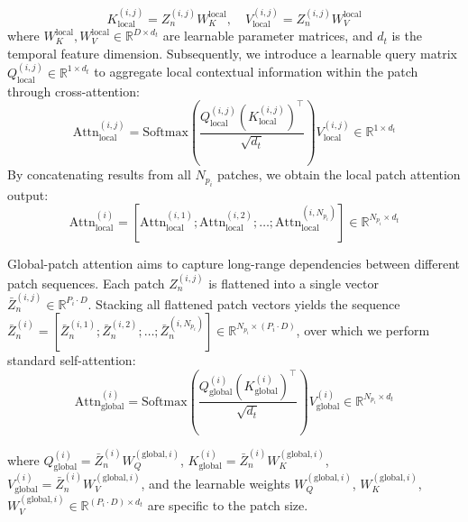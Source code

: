 \documentclass[5p,times,authoryear]{elsarticle}
\begin{document}
\begin{equation}
\label{eq:local_kv}
K_{\text{local}}^{(i,j)} = Z_n^{(i,j)} W_K^{\text{local}}, \quad V_{\text{local}}^{(i,j)} = Z_n^{(i,j)} W_V^{\text{local}}
\end{equation}
where $W_K^{\text{local}}, W_V^{\text{local}} \in \mathbb{R}^{D \times d_t}$ are learnable parameter matrices, and $d_t$ is the temporal feature dimension. Subsequently, we introduce a learnable query matrix $Q_{\text{local}}^{(i,j)} \in \mathbb{R}^{1 \times d_t}$ to aggregate local contextual information within the patch through cross-attention:
\vspace{-3pt}
\begin{equation}
\label{eq:local_attention}
    \text{Attn}_{\text{local}}^{(i,j)} = \text{Softmax}\left(\frac{Q_{\text{local}}^{(i,j)} (K_{\text{local}}^{(i,j)})^\top}{\sqrt{d_t}}\right) V_{\text{local}}^{(i,j)} \in \mathbb{R}^{1 \times d_t}
\end{equation}
\vspace{-3pt}
By concatenating results from all $N_{p_i}$ patches, we obtain the local patch attention output:
\vspace{-3pt}
\begin{equation}
\label{eq:local_concat}
    \text{Attn}_{\text{local}}^{(i)} = [\text{Attn}_{\text{local}}^{(i,1)}; \text{Attn}_{\text{local}}^{(i,2)}; \dots; \text{Attn}_{\text{local}}^{(i,N_{p_i})}] \in \mathbb{R}^{N_{p_i} \times d_t}
\end{equation}
\vspace{-3pt}

Global-patch attention aims to capture long-range dependencies between different patch sequences. Each patch $Z_n^{(i,j)}$ is flattened into a single vector $\bar{Z}_n^{(i,j)} \in \mathbb{R}^{P_i \cdot D}$. Stacking all flattened patch vectors yields the sequence $\bar{Z}_n^{(i)} = [\bar{Z}_n^{(i,1)}; \bar{Z}_n^{(i,2)}; \dots; \bar{Z}_n^{(i,N_{p_i})}] \in \mathbb{R}^{N_{p_i} \times (P_i \cdot D)}$, over which we perform standard self-attention:
\vspace{-4pt}
\begin{equation}
\label{eq:global_attention}
    \text{Attn}_{\text{global}}^{(i)} = \text{Softmax}\left(\frac{Q_{\text{global}}^{(i)} (K_{\text{global}}^{(i)})^\top}{\sqrt{d_t}}\right) V_{\text{global}}^{(i)} \in \mathbb{R}^{N_{p_i} \times d_t}
\end{equation}

where $Q_{\text{global}}^{(i)} = \bar{Z}_n^{(i)} W_Q^{(\text{global},i)}$, $K_{\text{global}}^{(i)} = \bar{Z}_n^{(i)} W_K^{(\text{global},i)}$, $V_{\text{global}}^{(i)} = \bar{Z}_n^{(i)} W_V^{(\text{global},i)}$, and the learnable weights $W_Q^{(\text{global},i)}$, $W_K^{(\text{global},i)}$, $W_V^{(\text{global},i)} \in \mathbb{R}^{(P_i \cdot D) \times d_t}$ are specific to the patch size.
\end{document}

